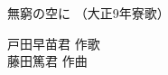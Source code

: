 \documentclass[10pt,b5j]{tarticle} %
\begin{document}
\begin{minipage}[c]{0.7\hsize} %
    \begin{center}
        {\LARGE
            無窮の空に %
        }
        {\small 
            （大正9年寮歌） %
        }
    \end{center}
\end{minipage}
\begin{minipage}[c]{0.3\hsize} %
    \begin{flushright} %
        戸田早苗君 作歌\\藤田篤君 作曲 %
    \end{flushright}
\end{minipage}
\end{document}
